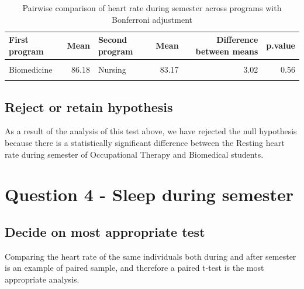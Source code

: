 \documentclass[preprint, 3p,
authoryear]{elsarticle} %
\begin{document}
\begin{table}

\caption{\label{tab:unnamed-chunk-5}Pairwise comparison of heart rate during semester across programs with Bonferroni adjustment}
\centering
\fontsize{7}{9}\selectfont
\begin{tabular}[t]{l|r|l|r|r|r}
\hline
\textbf{First program} & \textbf{Mean} & \textbf{Second program} & \textbf{Mean } & \textbf{Difference between means} & \textbf{p.value}\\
\hline
\cellcolor{gray!6}{Occupational Therapy} & \cellcolor{gray!6}{80.26} & \cellcolor{gray!6}{Nursing} & \cellcolor{gray!6}{83.17} & \cellcolor{gray!6}{-2.91} & \cellcolor{gray!6}{0.53}\\
\hline
Biomedicine & 86.18 & Nursing & 83.17 & 3.02 & 0.56\\
\hline
\cellcolor{gray!6}{Biomedicine} & \cellcolor{gray!6}{86.18} & \cellcolor{gray!6}{Occupational Therapy} & \cellcolor{gray!6}{80.26} & \cellcolor{gray!6}{5.92} & \cellcolor{gray!6}{0.02}\\
\hline
\end{tabular}
\end{table}

\hypertarget{reject-or-retain-hypothesis}{%
\subsection{Reject or retain
hypothesis}\label{reject-or-retain-hypothesis}}

As a result of the analysis of this test above, we have rejected the
null hypothesis because there is a statistically significant difference
between the Resting heart rate during semester of Occupational Therapy
and Biomedical students.

\hypertarget{question-4---sleep-during-semester}{%
\section{Question 4 - Sleep during
semester}\label{question-4---sleep-during-semester}}

\hypertarget{decide-on-most-appropriate-test}{%
\subsection{Decide on most appropriate
test}\label{decide-on-most-appropriate-test}}

Comparing the heart rate of the same individuals both during and after
semester is an example of paired sample, and therefore a paired t-test
is the most appropriate analysis.
\end{document}
